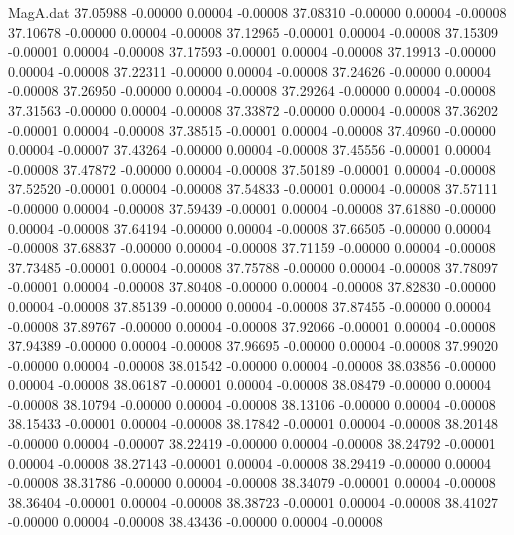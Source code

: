\begin{filecontents}{MagA.dat}
  37.05988   -0.00000    0.00004   -0.00008
  37.08310   -0.00000    0.00004   -0.00008
  37.10678   -0.00000    0.00004   -0.00008
  37.12965   -0.00001    0.00004   -0.00008
  37.15309   -0.00001    0.00004   -0.00008
  37.17593   -0.00001    0.00004   -0.00008
  37.19913   -0.00000    0.00004   -0.00008
  37.22311   -0.00000    0.00004   -0.00008
  37.24626   -0.00000    0.00004   -0.00008
  37.26950   -0.00000    0.00004   -0.00008
  37.29264   -0.00000    0.00004   -0.00008
  37.31563   -0.00000    0.00004   -0.00008
  37.33872   -0.00000    0.00004   -0.00008
  37.36202   -0.00001    0.00004   -0.00008
  37.38515   -0.00001    0.00004   -0.00008
  37.40960   -0.00000    0.00004   -0.00007
  37.43264   -0.00000    0.00004   -0.00008
  37.45556   -0.00001    0.00004   -0.00008
  37.47872   -0.00000    0.00004   -0.00008
  37.50189   -0.00001    0.00004   -0.00008
  37.52520   -0.00001    0.00004   -0.00008
  37.54833   -0.00001    0.00004   -0.00008
  37.57111   -0.00000    0.00004   -0.00008
  37.59439   -0.00001    0.00004   -0.00008
  37.61880   -0.00000    0.00004   -0.00008
  37.64194   -0.00000    0.00004   -0.00008
  37.66505   -0.00000    0.00004   -0.00008
  37.68837   -0.00000    0.00004   -0.00008
  37.71159   -0.00000    0.00004   -0.00008
  37.73485   -0.00001    0.00004   -0.00008
  37.75788   -0.00000    0.00004   -0.00008
  37.78097   -0.00001    0.00004   -0.00008
  37.80408   -0.00000    0.00004   -0.00008
  37.82830   -0.00000    0.00004   -0.00008
  37.85139   -0.00000    0.00004   -0.00008
  37.87455   -0.00000    0.00004   -0.00008
  37.89767   -0.00000    0.00004   -0.00008
  37.92066   -0.00001    0.00004   -0.00008
  37.94389   -0.00000    0.00004   -0.00008
  37.96695   -0.00000    0.00004   -0.00008
  37.99020   -0.00000    0.00004   -0.00008
  38.01542   -0.00000    0.00004   -0.00008
  38.03856   -0.00000    0.00004   -0.00008
  38.06187   -0.00001    0.00004   -0.00008
  38.08479   -0.00000    0.00004   -0.00008
  38.10794   -0.00000    0.00004   -0.00008
  38.13106   -0.00000    0.00004   -0.00008
  38.15433   -0.00001    0.00004   -0.00008
  38.17842   -0.00001    0.00004   -0.00008
  38.20148   -0.00000    0.00004   -0.00007
  38.22419   -0.00000    0.00004   -0.00008
  38.24792   -0.00001    0.00004   -0.00008
  38.27143   -0.00001    0.00004   -0.00008
  38.29419   -0.00000    0.00004   -0.00008
  38.31786   -0.00000    0.00004   -0.00008
  38.34079   -0.00001    0.00004   -0.00008
  38.36404   -0.00001    0.00004   -0.00008
  38.38723   -0.00001    0.00004   -0.00008
  38.41027   -0.00000    0.00004   -0.00008
  38.43436   -0.00000    0.00004   -0.00008

\end{filecontents}
